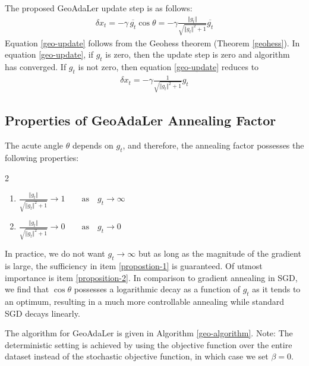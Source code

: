\documentclass{article}
\begin{document}
\noindent
The proposed GeoAdaLer update step is as follows:
\begin{align}\label{geo-update}
\delta x_t = - \gamma \, \overline{g_t} \cos\theta
 = - \gamma \frac{\Vert  g_t\Vert}{\sqrt{\Vert  g_t\Vert^2 + 1} }\overline{g_t}
\end{align}
Equation \eqref{geo-update} follows from the Geohess theorem (Theorem \ref{geohess}).
In equation \eqref{geo-update}, if $g_t$ is zero, then the update step is zero and algorithm has converged. If $g_t$ is not zero, then equation \eqref{geo-update} reduces to
\begin{align}
\delta x_t = - \gamma \frac{1}{\sqrt{\Vert  g_t\Vert^2 + 1} }g_t \nonumber
\end{align}

\subsection{Properties of GeoAdaLer Annealing Factor}
The acute angle $\theta$ depends on $g_t$,
and therefore, the annealing factor possesses the following properties:
\begin{multicols}{2}
\begin{enumerate}
\item $\displaystyle 
\frac{\Vert g_t \Vert}{\sqrt{\Vert g_t \Vert^2 + 1}} \to 1 \qquad \text{as} \quad g_t \to \infty \label{propostion-1}
$

\item $\displaystyle 
\frac{\Vert g_t \Vert}{\sqrt{\Vert g_t \Vert^2 + 1}} \to 0 \qquad \text{as} \quad g_t \to 0  \label{proposition-2}
$

\end{enumerate}
\end{multicols}

\noindent
In practice, we do not want $g_t \to \infty$ but as long as the magnitude of the gradient is large, the sufficiency in item \ref{propostion-1} is guaranteed. Of utmost importance is item \ref{proposition-2}.
In comparison to gradient annealing in SGD, we find that $\cos \theta$ possesses a logarithmic decay as a function of $g_t$ as it tends to an optimum, resulting in a much more controllable annealing while standard SGD  decays linearly.

The algorithm for GeoAdaLer is given in Algorithm \ref{geo-algorithm}. Note: The deterministic setting is achieved by using the objective function over the entire dataset instead of the stochastic objective function, in which case we set $\beta=0$.
\end{document}

